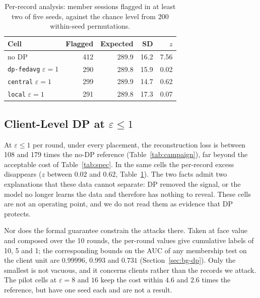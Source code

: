 \begin{table}[t]
\centering
\caption{Per-record analysis: member sessions flagged in at least two of five
seeds, against the chance level from 200 within-seed permutations.}
\label{tab:perrecord}
\footnotesize
\begin{tabular}{@{}lrrrr@{}}
\toprule
Cell & Flagged & Expected & SD & $z$ \\
\midrule
no DP                              & 412 & 289.9 & 16.2 & 7.56 \\
\texttt{dp-fedavg} $\varepsilon{=}1$ & 290 & 289.8 & 15.9 & 0.02 \\
\texttt{central} $\varepsilon{=}1$   & 299 & 289.9 & 14.7 & 0.62 \\
\texttt{local} $\varepsilon{=}1$     & 291 & 289.8 & 17.3 & 0.07 \\
\bottomrule
\end{tabular}
\end{table}

\subsection{Client-Level DP at \texorpdfstring{$\varepsilon \le 1$}{eps <= 1}}
\label{sec:results-dp-low}

At $\varepsilon \le 1$ per round, under every placement, the reconstruction
loss is between 108 and 179 times the no-DP reference
(Table~\ref{tab:campaign}), far beyond the acceptable cost of
Table~\ref{tab:spec}. In the same cells the per-record excess disappears
($z$ between $0.02$ and $0.62$, Table~\ref{tab:perrecord}). The two facts
admit two explanations that these data cannot separate: DP removed the signal,
or the model no longer learns the data and therefore has nothing to reveal.
These cells are not an operating point, and we do not read them as evidence
that DP protects.

Nor does the formal guarantee constrain the attacks there. Taken at face value
and composed over the 10 rounds, the per-round values give cumulative labels
of 10, 5 and 1; the corresponding bounds on the AUC of any membership test on
the client unit are $0.99996$, $0.993$ and $0.731$ (Section~\ref{sec:bg-dp}).
Only the smallest is not vacuous, and it concerns clients rather than the
records we attack. The pilot cells at $\varepsilon = 8$ and $16$ keep the cost
within $4.6$ and $2.6$ times the reference, but have one seed each and are not
a result.


